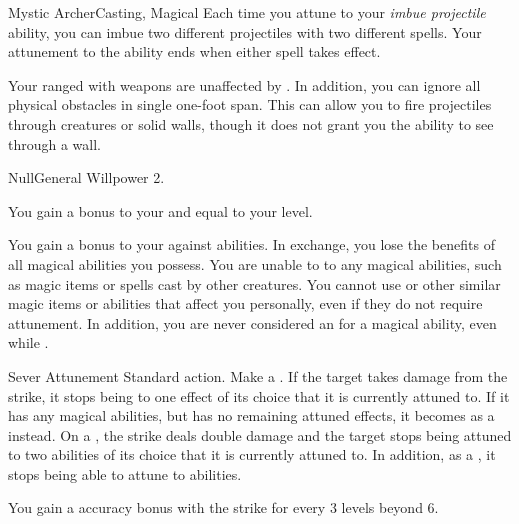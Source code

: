 \begin{magicalfeat}{Mystic Archer}{Casting, Magical}
     Each time you attune to your \textit{imbue projectile} ability, you can imbue two different projectiles with two different spells.
    Your attunement to the ability ends when either spell takes effect.

     Your ranged  with  weapons are unaffected by .
    In addition, you can ignore all physical obstacles in single one-foot span.
    This can allow you to fire projectiles through creatures or solid walls, though it does not grant you the ability to see through a wall.
  \end{magicalfeat}

  \begin{feat}{Null}{General}
    \featpre Willpower 2.

     You gain a bonus to your  and  equal to your level.

     You gain a  bonus to your  against \magical abilities.
    In exchange, you lose the benefits of all magical abilities you possess.
    You are unable to  to any magical abilities, such as magic items or spells cast by other creatures.
    You cannot use  or other similar magic items or abilities that affect you personally, even if they do not require attunement.
    In addition, you are never considered an  for a magical ability, even while \unconscious.

    \begin{activeability}{Sever Attunement}
      \abilityusagetime Standard action.
      \rankline
      Make a .
      If the target takes damage from the strike, it stops being  to one effect of its choice that it is currently attuned to.
      If it has any magical abilities, but has no remaining attuned effects, it becomes \stunned as a  instead.
      On a , the strike deals double damage and the target stops being attuned to two abilities of its choice that it is currently attuned to.
      In addition, as a , it stops being able to attune to abilities.

      \rankline
      You gain a  accuracy bonus with the strike for every 3 levels beyond 6.
    \end{activeability}


\end{feat}
